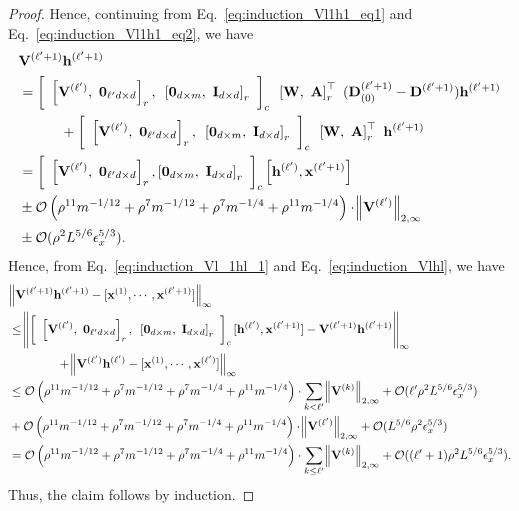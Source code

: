 \begin{proof}
	
	Hence, continuing from Eq.~\ref{eq:induction_Vl1h1_eq1} and Eq.~\ref{eq:induction_Vl1h1_eq2}, we have
	\begingroup\allowdisplaybreaks
	\begin{align*}
		&\mathbf{V}^{(\ell' + 1)}  \mathbf{h}^{(\ell' + 1)} \nonumber\\&
		= \left[\text{ }\left[\mathbf{V}^{(\ell')}, \text{ } \mathbf{0}_{\ell'd \times d}\right]_r,\text{ } \left[\mathbf{0}_{d \times m},\text{ } \mathbf{I}_{d \times d}\right]_r\text{ }\right]_c  \text{ } \left[\mathbf{W}, \text{ } \mathbf{A}\right]_r^{\top} \text{ }  (\mathbf{D}^{(\ell'+1)}_{(0)} - \mathbf{D}^{(\ell'+1)}) \mathbf{h}^{(\ell' + 1)} \\&
		\quad \quad \quad + \left[\text{ }\left[\mathbf{V}^{(\ell')}, \text{ } \mathbf{0}_{\ell'd \times d}\right]_r,\text{ } \left[\mathbf{0}_{d \times m},\text{ } \mathbf{I}_{d \times d}\right]_r\text{ }\right]_c  \text{ } \left[\mathbf{W}, \text{ } \mathbf{A}\right]_r^{\top} \text{ }  \mathbf{h}^{(\ell' + 1)} \\&
		=  \left[\text{ }\left[\mathbf{V}^{(\ell')}, \text{ } \mathbf{0}_{\ell'd \times d}\right]_r, \left[\mathbf{0}_{d \times m},\text{ } \mathbf{I}_{d \times d}\right]_r\text{ }\right]_c \left[\mathbf{h}^{(\ell')}, \mathbf{x}^{(\ell'+1)} \right] 
		\\& \pm \mathcal{O}\left(\rho^{11} m^{-1/12} + \rho^{7} m^{-1/12} + \rho^{7} m^{-1/4} + \rho^{11} m^{-1/4}  \right)  \cdot \norm{\mathbf{V}^{(\ell')}}_{2, \infty} \\&
		\pm \mathcal{O}(\rho^2 L^{5/6} \epsilon_x^{5/3}).
	\end{align*}
	\endgroup
	Hence, from Eq.~\ref{eq:induction_Vl_1hl_1} and Eq.~\ref{eq:induction_Vlhl}, we have
	\begingroup\allowdisplaybreaks
	\begin{align*}
		&\norm{ \mathbf{V}^{(\ell' + 1)}  \mathbf{h}^{(\ell' + 1)} - [\mathbf{x}^{(1)}, \cdots,  \mathbf{x}^{(\ell' + 1)}]}_\infty \\
		&\le \norm{ \left[\text{ }\left[\mathbf{V}^{(\ell')}, \text{ } \mathbf{0}_{\ell'd \times d}\right]_r,\text{ } \left[\mathbf{0}_{d \times m},\text{ } \mathbf{I}_{d \times d}\right]_r\text{ }\right]_c [\mathbf{h}^{(\ell')}, \mathbf{x}^{(\ell' + 1)}] - \mathbf{V}^{(\ell' + 1)}  \mathbf{h}^{(\ell' + 1)}}_\infty  \\& \quad \quad \quad \quad +  \norm{ \mathbf{V}^{(\ell')} \mathbf{h}^{(\ell')} - [\mathbf{x}^{(1)}, \cdots, \mathbf{x}^{(\ell')}]}_\infty \\&
		\le \mathcal{O}\left(\rho^{11} m^{-1/12} + \rho^{7} m^{-1/12} + \rho^{7} m^{-1/4} + \rho^{11} m^{-1/4}  \right)  \cdot \sum_{k < \ell'} \norm{\mathbf{V}^{(k)}}_{2, \infty} + \mathcal{O}(\ell' \rho^2 L^{5/6} \epsilon_x^{5/3})
		\\& +\mathcal{O}\left(\rho^{11} m^{-1/12} + \rho^{7} m^{-1/12} + \rho^{7} m^{-1/4} + \rho^{11} m^{-1/4}  \right)  \cdot \norm{\mathbf{V}^{(\ell')}}_{2, \infty} + \mathcal{O}(L^{5/6} \rho^2 \epsilon_x^{5/3}) \\&
		= \mathcal{O}\left(\rho^{11} m^{-1/12} + \rho^{7} m^{-1/12} + \rho^{7} m^{-1/4} + \rho^{11} m^{-1/4}  \right)  \cdot \sum_{k 
			\le \ell'} \norm{\mathbf{V}^{(k)}}_{2, \infty} + \mathcal{O}((\ell' + 1) \rho^2 L^{5/6} \epsilon_x^{5/3}).
	\end{align*}
	\endgroup
	Thus, the claim follows by induction.
	

\end{proof}
